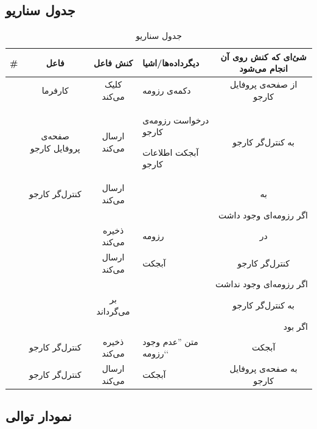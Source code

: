 \documentclass[12pt,svgnames,oneside]{book}
\newcommand{\say}[1]{‍''{#1}`‍`}
\newcommand{\json}{\lr{JSON} }
\newcommand{\gdm}{\lr{GDM} }
\newcommand{\none}{\lr{None} }
\begin{document}
\subsection{جدول سناریو}
\newcommand{\sstep}{\stepcounter{SenarioCounter}\arabic{SenarioCounter}}
\begin{table}[H]
\caption{جدول سناریو }
\begin{adjustbox}{width=\textwidth}
\begin{tabular}{|c|c|c|p{}|c|}
\hline
\# & فاعل & کنش فاعل & دیگرداده‌ها/اشیا & شئ‌ای که کنش روی آن انجام می‌شود \\
\hline
\hline
\sstep & 
کارفرما &
کلیک می‌کند &
دکمه‌ی رزومه &
از صفحه‌ی پروفایل کارجو \\
\hline
\sstep & 
صفحه‌ی پروفایل کارجو &
ارسال می‌کند &
\begin{inparaitem}
	\item درخواست رزومه‌ی کارجو
	\item آبجکت \json اطلاعات کارجو
\end{inparaitem} &
به کنترل‌گر کارجو \\
\hline
\sstep & 
کنترل‌گر کارجو &
ارسال می‌کند &
\json &
به \gdm \\
\hline
\sstep & \multicolumn{4}{|r|}{اگر رزومه‌ای وجود داشت} \\
\hline
\sstep & 
\gdm &
ذخیره می‌کند &
رزومه &
در \json\\
\hline
\sstep & 
\gdm &
ارسال می‌کند &
آبجکت \json &
کنترل‌گر کارجو \\
\hline
\sstep & \multicolumn{4}{|r|}{اگر رزومه‌ای وجود نداشت}\\
\hline
\sstep & 
\gdm&
بر می‌گرداند &
\none&
به کنترل‌گر کارجو \\
\hline
\sstep & \multicolumn{4}{|r|}{اگر \none بود} \\
\hline
\sstep & 
کنترل‌گر کارجو &
ذخیره می‌کند &
متن \say{عدم وجود رزومه}&
آبجکت \json\\
\hline
\sstep & 
کنترل‌گر کارجو &
ارسال می‌کند &
آبجکت \json &
به صفحه‌ی پروفایل کارجو \\
\hline
\end{tabular}
\end{adjustbox}
\end{table}
\setcounter{MainStepCounter}{0}
\setcounter{SenarioCounter}{0}
\subsection{نمودار توالی}
\end{document}
